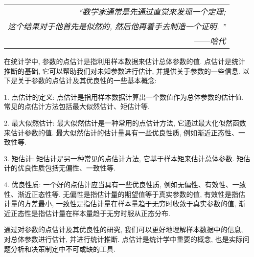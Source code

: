 \begin{flushright}
    \begin{tabular}{r|||}
        \textit{“数学家通常是先通过直觉来发现一个定理; }\\
        \textit{这个结果对于他首先是似然的, 然后他再着手去制造一个证明. ”}\\
        ——\textit{哈代}
    \end{tabular}
\end{flushright}

在统计学中, 参数的点估计是指利用样本数据来估计总体参数的值. 点估计是统计推断的基础, 它可以帮助我们对未知参数进行估计, 并提供关于参数的一些信息. 以下是关于参数的点估计及其优良性的一些基本概念: 

1. 点估计的定义: 点估计是指用样本数据计算出一个数值作为总体参数的估计值. 常见的点估计方法包括最大似然估计、矩估计等. 

2. 最大似然估计: 最大似然估计是一种常用的点估计方法, 它通过最大化似然函数来估计参数的值. 最大似然估计的估计量具有一些优良性质, 例如渐近正态性、一致性等. 

3. 矩估计: 矩估计是另一种常见的点估计方法, 它基于样本矩来估计总体参数. 矩估计的优良性质包括无偏性、一致性等. 

4. 优良性质: 一个好的点估计应当具有一些优良性质, 例如无偏性、有效性、一致性、渐近正态性等. 无偏性是指估计量的期望值等于真实参数的值, 有效性是指估计量的方差最小, 一致性是指估计量在样本量趋于无穷时收敛于真实参数的值, 渐近正态性是指估计量在样本量趋于无穷时服从正态分布. 

通过对参数的点估计及其优良性的研究, 我们可以更好地理解样本数据中的信息, 对总体参数进行估计, 并进行统计推断. 点估计是统计学中重要的概念, 也是实际问题分析和决策制定中不可或缺的工具. 